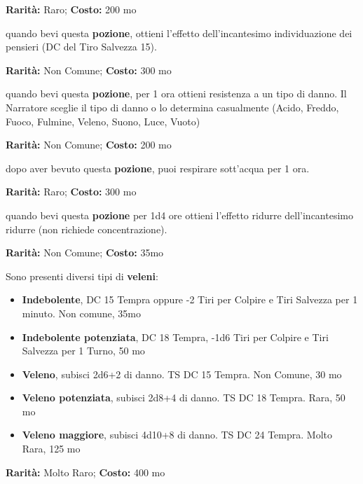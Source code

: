 \begin{multicols}{2}
\textbf{Rarità:} Raro; \textbf{Costo:} 200 mo

quando bevi questa \textbf{pozione}, ottieni l'effetto dell'incantesimo individuazione dei pensieri (DC del Tiro Salvezza 15).


\textbf{Rarità:} Non Comune; \textbf{Costo:} 300 mo

quando bevi questa \textbf{pozione}, per 1 ora ottieni resistenza a un tipo di danno. Il Narratore sceglie il tipo di danno o lo determina casualmente (Acido, Freddo, Fuoco, Fulmine, Veleno, Suono, Luce, Vuoto)


\textbf{Rarità:} Non Comune; \textbf{Costo:} 200 mo

dopo aver bevuto questa \textbf{pozione}, puoi respirare sott'acqua per 1 ora.


\textbf{Rarità:} Raro; \textbf{Costo:} 300 mo

quando bevi questa \textbf{pozione} per 1d4 ore ottieni l'effetto ridurre dell'incantesimo  ridurre (non richiede concentrazione).


\textbf{Rarità:} Non Comune; \textbf{Costo:} 35mo

Sono presenti diversi tipi di \textbf{veleni}:

\begin{itemize} \setlength\itemsep{0em}
\item \textbf{Indebolente}, DC 15 Tempra oppure -2 Tiri per Colpire e Tiri Salvezza per 1 minuto. Non comune, 35mo
\item \textbf{Indebolente potenziata}, DC 18 Tempra, -1d6 Tiri per Colpire e Tiri Salvezza per 1 Turno, 50 mo
\item \textbf{Veleno}, subisci 2d6+2 di danno. TS DC 15 Tempra. Non Comune, 30 mo
\item \textbf{Veleno potenziata}, subisci 2d8+4 di danno. TS DC 18 Tempra. Rara, 50 mo
\item \textbf{Veleno maggiore}, subisci 4d10+8 di danno. TS DC 24 Tempra. Molto Rara, 125 mo
\end{itemize}


\textbf{Rarità:} Molto Raro; \textbf{Costo:} 400 mo


\end{multicols}
